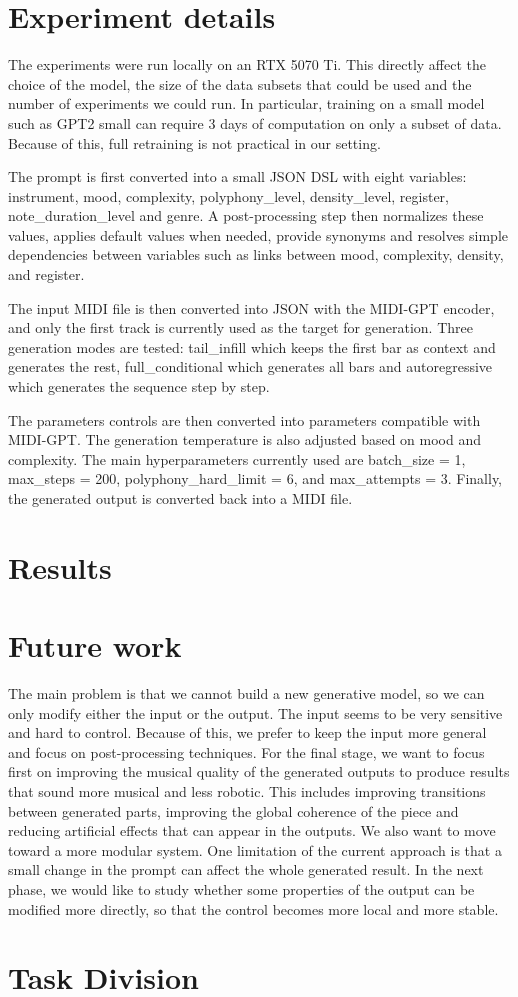 \documentclass[11pt]{article}
\begin{document}
\section{Experiment details}

The experiments were run locally on an RTX 5070 Ti. This directly affect the choice of the model, the size of the data subsets that could be used and the number of experiments we could run. In particular, training on a small model such as GPT2 small can require 3 days of computation on only a subset of data. Because of this, full retraining is not practical in our setting.

The prompt is first converted into a small JSON DSL with eight variables: instrument, mood, complexity, polyphony\_level, density\_level, register, note\_duration\_level and genre. A post-processing step then normalizes these values, applies default values when needed, provide synonyms and resolves simple dependencies between variables such as links between mood, complexity, density, and register.

The input MIDI file is then converted into JSON with the MIDI-GPT encoder, and only the first track is currently used as the target for generation. Three generation modes are tested: tail\_infill which keeps the first bar as context and generates the rest, full\_conditional which generates all bars and autoregressive which generates the sequence step by step.

The parameters controls are then converted into parameters compatible with MIDI-GPT. The generation temperature is also adjusted based on mood and complexity. The main hyperparameters currently used are batch\_size = 1, max\_steps = 200, polyphony\_hard\_limit = 6, and max\_attempts = 3. Finally, the generated output is converted back into a MIDI file. 

\section{Results}



\section{Future work}

The main problem is that we cannot build a new generative model, so we can only modify either the input or the output. The input seems to be very sensitive and hard to control. Because of this, we prefer to keep the input more general and focus on post-processing techniques. For the final stage, we want to focus first on improving the musical quality of the generated outputs to produce results that sound more musical and less robotic. This includes improving transitions between generated parts, improving the global coherence of the piece and reducing artificial effects that can appear in the outputs. We also want to move toward a more modular system. One limitation of the current approach is that a small change in the prompt can affect the whole generated result. In the next phase, we would like to study whether some properties of the output can be modified more directly, so that the control becomes more local and more stable.

\section{Task Division}


\end{document}
